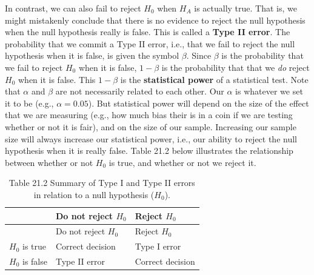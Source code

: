 \documentclass[
]{scrbook}
\begin{document}
In contrast, we can also fail to reject \(H_{0}\) when \(H_{A}\) is actually true.
That is, we might mistakenly conclude that there is no evidence to reject the null hypothesis when the null hypothesis really is false.
This is called a \textbf{Type II error}.
The probability that we commit a Type II error, i.e., that we fail to reject the null hypothesis when it is false, is given the symbol \(\beta\).
Since \(\beta\) is the probability that we fail to reject \(H_{0}\) when it is false, \(1 - \beta\) is the probability that that we \emph{do} reject \(H_{0}\) when it is false.
This \(1 - \beta\) is the \textbf{statistical power} of a statistical test.
Note that \(\alpha\) and \(\beta\) are not necessarily related to each other.
Our \(\alpha\) is whatever we set it to be (e.g., \(\alpha = 0.05\)).
But statistical power will depend on the size of the effect that we are measuring (e.g., how much bias their is in a coin if we are testing whether or not it is fair), and on the size of our sample.
Increasing our sample size will always increase our statistical power, i.e., our ability to reject the null hypothesis when it is really false.
Table 21.2 below illustrates the relationship between whether or not \(H_{0}\) is true, and whether or not we reject it.

\begin{longtable}[]{@{}lll@{}}
\caption{Table 21.2 Summary of Type I and Type II errors in relation to a null hypothesis (\(H_{0}\)).}\tabularnewline
\toprule
& Do not reject \(H_{0}\) & Reject \(H_{0}\) \\
\midrule
\endfirsthead
\toprule
& Do not reject \(H_{0}\) & Reject \(H_{0}\) \\
\midrule
\endhead
\(H_{0}\) is true & Correct decision & Type I error \\
\(H_{0}\) is false & Type II error & Correct decision \\
\bottomrule
\end{longtable}
\end{document}
